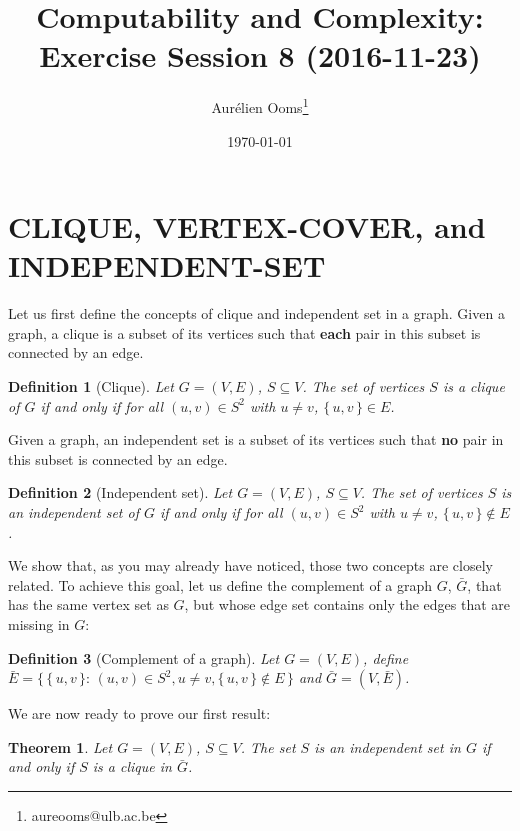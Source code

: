 \documentclass{article}
\title{Computability and Complexity:\\Exercise Session 8 (2016-11-23)}
\author{Aurélien Ooms\footnote{aureooms@ulb.ac.be}}
\date{\today}
\newcommand{\theoremname}{Theorem}
\newcommand{\definitionname}{Definition}
\newtheorem{theorem}{\theoremname}
\newtheorem{definition}{\definitionname}
\newcommand{\st}{\colon\,}
\begin{document}
\maketitle
\tableofcontents

\section{CLIQUE, VERTEX-COVER, and INDEPENDENT-SET}

Let us first define the concepts of clique and independent set in a graph.
Given a graph, a clique is a subset of its vertices such that \textbf{each} pair in this
subset is connected by an edge.

\begin{definition}[Clique]
  Let $G=(V,E)$, $S\subseteq V$. The set of vertices $S$ is a clique of $G$
  if and only if for all $(u,v) \in S^2$ with $u\ne v$, $\{\,u,v\,\} \in E$.
\end{definition}

Given a graph, an independent set is a subset of its vertices such that
\textbf{no} pair in this
subset is connected by an edge.
\begin{definition}[Independent set]
  Let $G=(V,E)$, $S\subseteq V$. The set of vertices $S$ is an independent set
  of $G$ if and only if for all $(u,v) \in S^2$ with $u\ne v$, $\{\,u,v\,\} \not\in E$.
\end{definition}

We show that, as you may already have noticed, those two concepts are
closely related. To achieve this goal, let us define the complement of a graph
$G$, $\bar{G}$, that has the same vertex set as $G$, but whose edge set
contains only the edges that are missing in $G$:
\begin{definition}[Complement of a graph]
  Let $G = (V,E)$, define $\bar{E}=\{\,\{\,u,v\,\} \st (u,v) \in S^2,
  u \ne v, \{\,u,v\,\} \not\in E\,\}$ and $\bar{G} = (V,\bar{E})$.
\end{definition}

We are now ready to prove our first result:
\begin{theorem}\label{is-cl}
  Let $G = (V,E)$, $S \subseteq V$. The set $S$ is an independent set in $G$ if
  and only if $S$ is a clique in $\bar{G}$.
\end{theorem}
\end{document}
